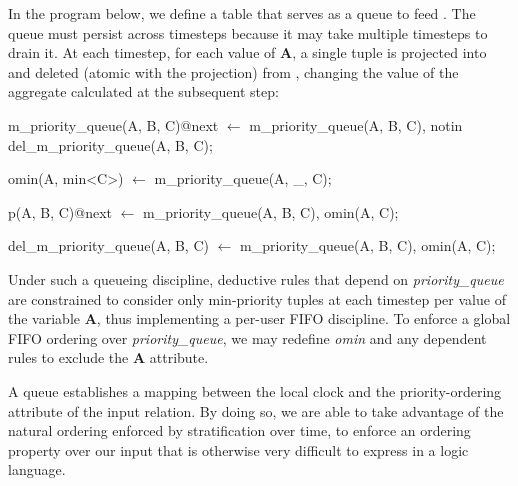 In the program below, we define a table  that
serves as a queue to feed .  The queue must persist
across timesteps because it may take multiple timesteps to drain it.  At each
timestep, for each value of \textbf{A}, a single tuple is projected into
 and deleted (atomic with the projection) from
, changing the value of the aggregate calculated
at the subsequent step:

\begin{Dedalus}
m\_priority\_queue(A, B, C)@next \(\leftarrow\)
  m\_priority\_queue(A, B, C),
  notin del\_m\_priority\_queue(A, B, C);

omin(A, min<C>) \(\leftarrow\)
  m\_priority\_queue(A, _, C);

p(A, B, C)@next \(\leftarrow\)
  m\_priority\_queue(A, B, C),
  omin(A, C);

del\_m\_priority\_queue(A, B, C) \(\leftarrow\)
  m\_priority\_queue(A, B, C),
  omin(A, C);
\end{Dedalus}

Under such a queueing discipline, deductive rules that depend on
\emph{priority\_queue} are constrained to consider only min-priority tuples at each timestep
per value of the variable \textbf{A}, thus implementing a per-user FIFO
discipline.  To enforce a global FIFO ordering over \emph{priority\_queue}, we
may redefine \emph{omin} and any dependent rules to exclude the \textbf{A}
attribute.

A queue establishes a mapping between the local clock and the priority-ordering attribute of the input relation. By doing so, we are able to take
advantage of the natural ordering enforced by stratification over time, to enforce an ordering property over our input that is otherwise 
very difficult to express in a logic language.



